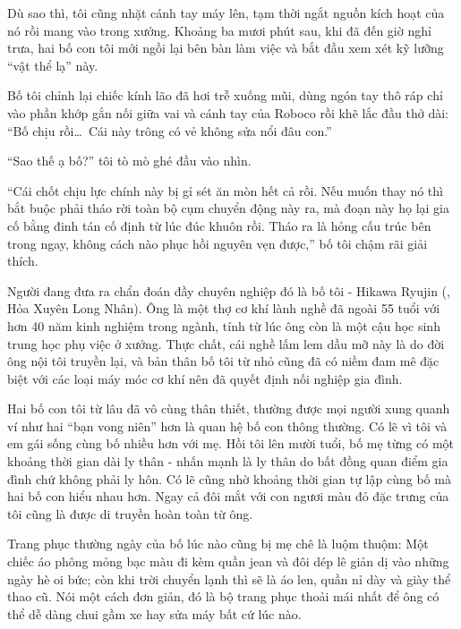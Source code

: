 \documentclass[../main.tex]{subfiles}
\begin{document}
Dù sao thì, tôi cũng nhặt cánh tay máy lên, tạm thời ngắt nguồn kích hoạt của nó rồi mang vào trong xưởng. Khoảng ba mươi phút sau, khi đã đến giờ nghỉ trưa, hai bố con tôi mới ngồi lại bên bàn làm việc và bắt đầu xem xét kỹ lưỡng ``vật thể lạ'' này.

\ct

Bố tôi chỉnh lại chiếc kính lão đã hơi trễ xuống mũi, dùng ngón tay thô ráp chỉ vào phần khớp gắn nối giữa vai và cánh tay của Roboco rồi khẽ lắc đầu thở dài: ``Bố chịu rồi\dots\ Cái này trông có vẻ không sửa nổi đâu con.''

``Sao thế ạ bố?'' tôi tò mò ghé đầu vào nhìn.

``Cái chốt chịu lực chính này bị gỉ sét ăn mòn hết cả rồi. Nếu muốn thay nó thì bắt buộc phải tháo rời toàn bộ cụm chuyển động này ra, mà đoạn này họ lại gia cố bằng đinh tán cố định từ lúc đúc khuôn rồi. Tháo ra là hỏng cấu trúc bên trong ngay, không cách nào phục hồi nguyên vẹn được,'' bố tôi chậm rãi giải thích.

\chrint

Người đang đưa ra chẩn đoán đầy chuyên nghiệp đó là bố tôi - Hikawa Ryujin (, Hỏa Xuyên Long Nhân). Ông là một thợ cơ khí lành nghề đã ngoài 55 tuổi với hơn 40 năm kinh nghiệm trong ngành, tính từ lúc ông còn là một cậu học sinh trung học phụ việc ở xưởng. Thực chất, cái nghề lấm lem dầu mỡ này là do đời ông nội tôi truyền lại, và bản thân bố tôi từ nhỏ cũng đã có niềm đam mê đặc biệt với các loại máy móc cơ khí nên đã quyết định nối nghiệp gia đình.

Hai bố con tôi từ lâu đã vô cùng thân thiết, thường được mọi người xung quanh ví như hai ``bạn vong niên'' hơn là quan hệ bố con thông thường. Có lẽ vì tôi và em gái sống cùng bố nhiều hơn với mẹ. Hồi tôi lên mười tuổi, bố mẹ từng có một khoảng thời gian dài ly thân - nhấn mạnh là ly thân do bất đồng quan điểm gia đình chứ không phải ly hôn. Có lẽ cũng nhờ khoảng thời gian tự lập cùng bố mà hai bố con hiểu nhau hơn. Ngay cả đôi mắt với con ngươi màu đỏ đặc trưng của tôi cũng là được di truyền hoàn toàn từ ông.

Trang phục thường ngày của bố lúc nào cũng bị mẹ chê là luộm thuộm: Một chiếc áo phông mỏng bạc màu đi kèm quần jean và đôi dép lê giản dị vào những ngày hè oi bức; còn khi trời chuyển lạnh thì sẽ là áo len, quần nỉ dày và giày thể thao cũ. Nói một cách đơn giản, đó là bộ trang phục thoải mái nhất để ông có thể dễ dàng chui gầm xe hay sửa máy bất cứ lúc nào.
\end{document}
